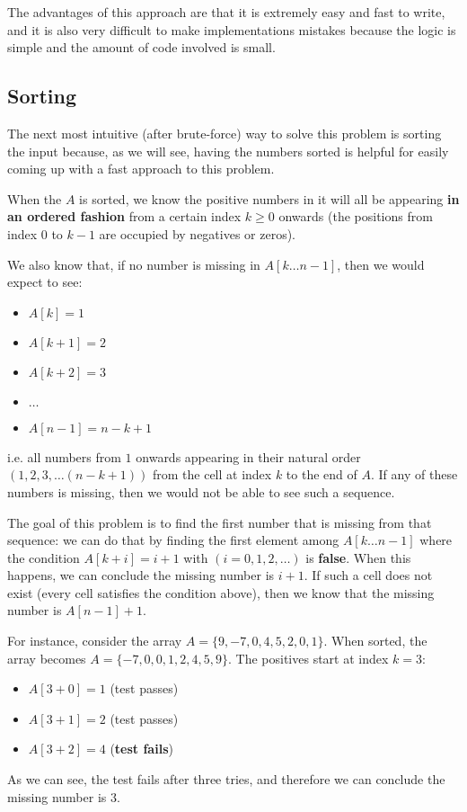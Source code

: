 The advantages of this approach are that it is extremely easy and fast to write, and it is also very difficult to make implementations mistakes because the logic is simple and the amount of code involved is small.


\subsection{Sorting}
\label{first_positive_missing:sec:sorting}

The next most intuitive (after brute-force) way to solve this problem is sorting the input because, as we will see, having the numbers sorted is helpful for easily coming up with a fast approach to this problem.

When the $A$ is sorted, we know the positive numbers in it will all be appearing \textbf{in an ordered fashion} from a certain index $k\geq 0$ onwards (the positions from index $0$ to $k-1$ are occupied by negatives or zeros). 

We also know that, if no number is missing in $A[k \ldots n-1]$, then we would expect to see: 
\begin{itemize}
	\item $A[k]=1$
	\item $A[k+1]=2$
	\item $A[k+2]=3$
	\item $\ldots$
	\item $A[n-1]=n-k+1$
\end{itemize}

i.e. all numbers from $1$ onwards appearing in their natural order $(1,2,3, \ldots (n-k+1))$ from the cell at index $k$ to the end of $A$. 
If any of these numbers is missing, then we would not be able to see such a sequence.

The goal of this problem is to find the first number that is missing from that sequence: we can do that by finding the first element among $A[k \ldots n-1]$  where the condition $A[k+i]=i+1$ with $(i=0,1,2, \ldots)$ is \textbf{false}. When this happens, we can conclude the missing number is $i+1$.
If such a cell does not exist (every cell satisfies the condition above), then we know that the missing number is $A[n-1]+1$.

For instance, consider the array $A=\{ 9,-7,0,4,5,2,0,1\}$. When sorted, the array
becomes $A=\{ -7,0,0,1,2,4,5,9\}$. The positives start at index $k=3$:
\begin{itemize}
	\item $A[3+0] = 1$ (test passes)
	\item $A[3+1] = 2$ (test passes)
	\item $A[3+2] = 4$ (\textbf{test fails})
\end{itemize}
As we can see, the test fails after three tries, and therefore we can conclude the missing number is $3$.


